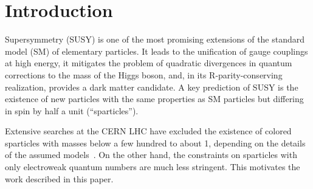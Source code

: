 \section{Introduction}
\label{sect:introduction}

Supersymmetry  (SUSY) \cite{Golfand:1971iw,Wess:1973kz,Wess:1974tw,Fayet1,Fayet2} is one of the most promising extensions of the 
standard model (SM) of elementary particles.  It leads to the unification of gauge couplings at
high energy, it mitigates the problem of quadratic divergences in quantum corrections to the
mass of the Higgs boson, and, in its R-parity-conserving realization, provides a dark matter candidate.
A key prediction of SUSY is the existence of new particles with the same properties as SM particles but
differing in spin by half a unit (``sparticles'').
%

Extensive searches at the CERN LHC have excluded the existence of colored sparticles with masses below a few hundred \GeV to about 1\TeV,
depending on the details of the assumed models~\cite{Chatrchyan:2012paa,Chatrchyan:2013xna,Chatrchyan:2013wxa,Chatrchyan:2013fea,Chatrchyan:2013mys,Chatrchyan:2014aea,Chatrchyan:2014lfa,Khachatryan:2015exa,Khachatryan:2015vra,Khachatryan:2015lwa}. %
On the other hand, the constraints on sparticles with only electroweak quantum numbers are much less stringent.  This motivates the
work described in this paper.

